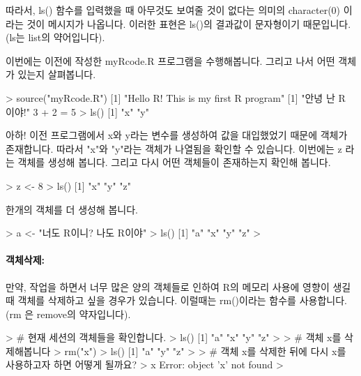 \begin{Schunk}
\end{Schunk}
따라서, ls() 함수를 입력했을 때 아무것도 보여줄 것이 없다는 의미의 character(0) 이라는 것이 메시지가 나옵니다.
이러한 표현은 ls()의 결과값이 문자형이기 때문입니다.
(ls는 list의 약어입니다).

이번에는 이전에 작성한 myRcode.R 프로그램을 수행해봅니다.
그리고 나서 어떤 객체가 있는지 살펴봅니다.
\begin{Schunk}
\begin{Soutput}
> source("myRcode.R")
[1] "Hello R!  This is my first R program"
[1] "안녕 난 R 이야!"
3 + 2 = 5 
> ls()
[1] "x" "y"
\end{Soutput}
\end{Schunk}

아하! 이전 프로그램에서 x와 y라는 변수를 생성하여 값을 대입했었기 때문에 객체가 존재합니다. 
따라서 "x"와 "y"라는 객체가 나열됨을 확인할 수 있습니다.
이번에는 z 라는 객체를 생성해 봅니다.
그리고 다시 어떤 객체들이 존재하는지 확인해 봅니다. 

\begin{Schunk}
\begin{Soutput}
> z <- 8
> ls()
[1] "x" "y" "z"
\end{Soutput}
\end{Schunk}

한개의 객체를 더 생성해 봅니다. 

\begin{Schunk}
\begin{Soutput}
> a <- "너도 R이니?  나도 R이야"
> ls()
[1] "a" "x" "y" "z"
> 
\end{Soutput}
\end{Schunk}

\paragraph{객체삭제:} 만약, 작업을 하면서 너무 많은 양의 객체들로 인하여 R의 메모리 사용에 영향이 생길때 객체를 삭제하고 싶을 경우가 있습니다. 
이럴때는 rm()이라는 함수를 사용합니다.  
(rm 은 remove의 약자입니다).

\begin{Schunk}
\begin{Soutput}
> # 현재 세션의 객체들을 확인합니다. 
> ls()
[1] "a" "x" "y" "z"
>
> # 객체 x를 삭제해봅니다 
> rm("x")
> ls()
[1] "a" "y" "z"
> 
> # 객체 x를 삭제한 뒤에 다시 x를 사용하고자 하면 어떻게 될까요?
> x
Error: object 'x' not found
> 
\end{Soutput}
\end{Schunk}

